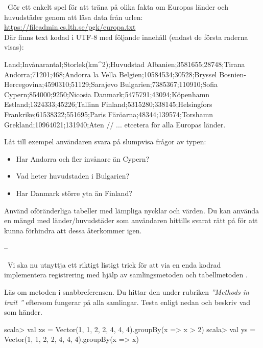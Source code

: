 \Task \what~Gör ett enkelt spel för att träna på olika fakta om Europas länder och huvudstäder genom att läsa data från urlen:\\ \url{https://fileadmin.cs.lth.se/pgk/europa.txt}
\\Där finns text kodad i UTF-8 med följande innehåll (endast de första raderna visas):
\begin{Code}
Land;Invånarantal;Storlek(km^2);Huvudstad
Albanien;3581655;28748;Tirana
Andorra;71201;468;Andorra la Vella
Belgien;10584534;30528;Bryssel
Bosnien-Hercegovina;4590310;51129;Sarajevo
Bulgarien;7385367;110910;Sofia
Cypern;854000;9250;Nicosia
Danmark;5475791;43094;Köpenhamn
Estland;1324333;45226;Tallinn
Finland;5315280;338145;Helsingfors
Frankrike;61538322;551695;Paris
Färöarna;48344;139574;Torshamn
Grekland;10964021;131940;Aten
// ... etcetera för alla Europas länder.
\end{Code}
Låt till exempel användaren svara på slumpvisa frågor av typen:
\begin{itemize}[noitemsep]
  \item Har Andorra och fler invånare än Cypern?
  \item Vad heter huvudstaden i Bulgarien?
  \item Har Danmark större yta än Finland?
\end{itemize}
Använd oföränderliga tabeller med lämpliga nycklar och värden. Du kan använda en mängd med länder/huvudstäder som användaren hittills svarat rätt på för att kunna förhindra att dessa återkommer igen.
\SOLUTION

\TaskSolved --

\QUESTEND



\AdvancedTasks %



\QUESTBEGIN

\Task \what~Vi ska nu utnyttja ett riktigt listigt trick för att via en enda kodrad implementera registrering med hjälp av samlingsmetoden  och tabellmetoden .

\Subtask Läs om metoden  i snabbreferensen. Du hittar den under rubriken \emph{''Methods in trait ''} eftersom  fungerar på alla samlingar. Testa  enligt nedan och beskriv vad som händer.

\begin{REPL}
scala> val xs = Vector(1, 1, 2, 2, 4, 4, 4).groupBy(x => x > 2)
scala> val ys = Vector(1, 1, 2, 2, 4, 4, 4).groupBy(x => x)
\end{REPL}

